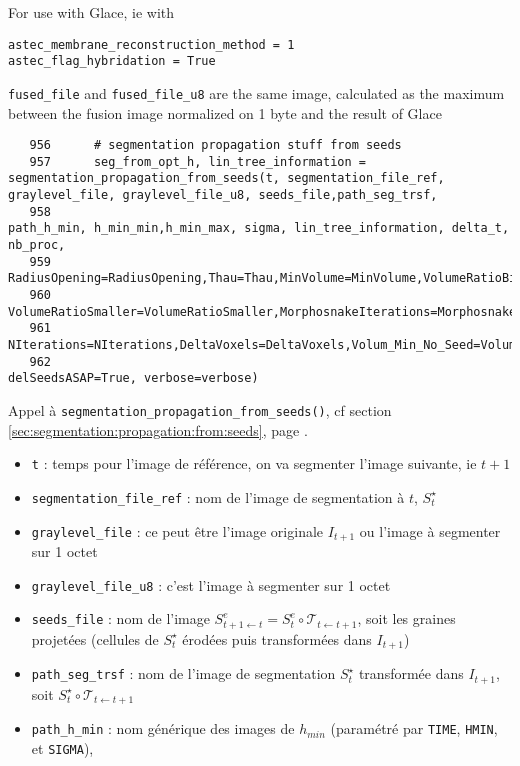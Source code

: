 \documentclass{article}
\def \mycolor {red}
\begin{document}
For use with Glace, ie with
\begin{verbatim}
astec_membrane_reconstruction_method = 1
astec_flag_hybridation = True 
\end{verbatim}
\verb|fused_file| and \verb|fused_file_u8| are the same image, calculated as the maximum between the fusion image normalized on 1 byte and the result of Glace
\color{black}
\begin{verbatim} 
   956	    # segmentation propagation stuff from seeds
   957	    seg_from_opt_h, lin_tree_information = segmentation_propagation_from_seeds(t, segmentation_file_ref, graylevel_file, graylevel_file_u8, seeds_file,path_seg_trsf, 
   958	                                                                               path_h_min, h_min_min,h_min_max, sigma, lin_tree_information, delta_t, nb_proc,
   959	                                                                               RadiusOpening=RadiusOpening,Thau=Thau,MinVolume=MinVolume,VolumeRatioBigger=VolumeRatioBigger,
   960	                                                                               VolumeRatioSmaller=VolumeRatioSmaller,MorphosnakeIterations=MorphosnakeIterations,
   961	                                                                               NIterations=NIterations,DeltaVoxels=DeltaVoxels,Volum_Min_No_Seed=Volum_Min_No_Seed, 
   962	                                                                               delSeedsASAP=True, verbose=verbose)
\end{verbatim} 
\color{\mycolor}
Appel \`a \texttt{segmentation\_propagation\_from\_seeds()}, cf section \ref{sec:segmentation:propagation:from:seeds}, page \pageref{sec:segmentation:propagation:from:seeds}.
\begin{itemize}
\itemsep -0.5ex
\item \verb|t| : temps pour l'image de r\'ef\'erence, on va segmenter l'image suivante, ie $t+1$
\item \verb|segmentation_file_ref| : nom de l'image de segmentation \`a $t$, $S^{\star}_t$
\item \verb|graylevel_file| : ce peut \^etre l'image originale $I_{t+1}$ ou  l'image \`a segmenter sur 1 octet
\item \verb|graylevel_file_u8| : c'est l'image \`a segmenter sur 1 octet
\item \verb|seeds_file| : nom de l'image $S^e_{t+1 \leftarrow t} = S^e_t \circ \mathcal{T}_{t \leftarrow t+1}$, soit les graines projet\'ees (cellules de $S^{\star}_t$ \'erod\'ees puis transform\'ees dans $I_{t+1}$)
\item \verb|path_seg_trsf| : nom de l'image de segmentation $S^{\star}_t$ transform\'ee dans $I_{t+1}$, soit
$S^{\star}_t \circ \mathcal{T}_{t \leftarrow t+1}$
\item \verb|path_h_min| : nom g\'en\'erique des images de $h_{min}$ (param\'etr\'e par \verb|TIME|, \verb|HMIN|, et \verb|SIGMA|),
\end{itemize}
\end{document}
